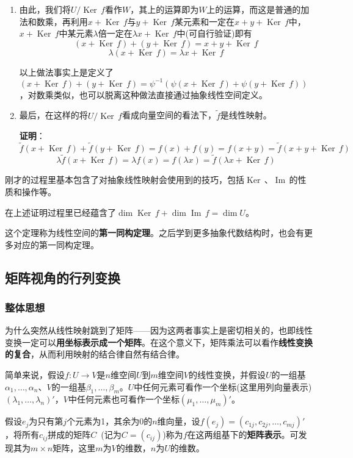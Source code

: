\documentclass[a4paper,UTF8,fontset=windows]{ctexart}
\DeclareMathOperator{\im}{Im\,}
\DeclareMathOperator{\Ker}{Ker\,}
\newcommand*{\note}{\noindent *}
\begin{document}
\begin{enumerate}
    \item 由此，我们将$U/\Ker f$看作$W$，其上的运算即为$W$上的运算，而这是普通的加法和数乘，再利用$x+\Ker f$与$y+\Ker f$某元素和一定在$x+y+\Ker f$中，$x+\Ker f$中某元素$\lambda$倍一定在$\lambda x+\Ker f$中(可自行验证)即有
    $$(x+\Ker f)+(y+\Ker f)=x+y+\Ker f$$
    $$\lambda(x+\Ker f)=\lambda x+\Ker f$$

    \note 以上做法事实上是定义了$(x+\Ker f)+(y+\Ker f)=\psi^{-1}(\psi(x+\Ker f)+\psi(y+\Ker f))$，对数乘类似，也可以脱离这种做法直接通过抽象线性空间定义。

    \item 最后，在这样的将$U/\Ker f$看成向量空间的看法下，$\tilde{f}$是线性映射。
    
    \textbf{证明}：
    $$\tilde{f}(x+\Ker f)+\tilde{f}(y+\Ker f)=f(x)+f(y)=f(x+y)=\tilde{f}(x+y+\Ker f)$$
    $$\lambda\tilde{f}(x+\Ker f)=\lambda f(x)=f(\lambda x)=\tilde{f}(\lambda x+\Ker f)$$
\end{enumerate}

\note 刚才的过程里基本包含了对抽象线性映射会使用到的技巧，包括$\Ker$、$\im$的性质和操作等。

\note 在上述证明过程里已经蕴含了$\dim\Ker f+\dim\im f=\dim U$。

这个定理称为线性空间的\textbf{第一同构定理}。之后学到更多抽象代数结构时，也会有更多对应的第一同构定理。

\subsection{矩阵视角的行列变换}
\subsubsection{整体思想}
为什么突然从线性映射跳到了矩阵——因为这两者事实上是密切相关的，也即线性变换一定可以\textbf{用坐标表示成一个矩阵}。在这个意义下，矩阵乘法可以看作\textbf{线性变换的复合}，从而利用映射的结合律自然有结合律。

简单来说，假设$f:U\to V$是$n$维空间$U$到$m$维空间$V$的线性变换，并假设$U$的一组基$\alpha_1,\dots,\alpha_n$、$V$的一组基$\beta_1,\dots,\beta_m$。$U$中任何元素可看作一个坐标(这里用列向量表示)$(\lambda_1,\dots,\lambda_n)'$，$V$中任何元素也可看作一个坐标$(\mu_1,\dots,\mu_m)'$。

假设$e_j$为只有第$j$个元素为1，其余为0的$n$维向量，设$f(e_j)=(c_{1j},c_{2j},\dots,c_{mj})'$，将所有$c_{ij}$拼成的矩阵$C$\ (记为$C=(c_{ij})$)称为$f$在这两组基下的\textbf{矩阵表示}。可发现其为$m\times n$矩阵，这里$m$为$V$的维数，$n$为$U$的维数。
\end{document}
